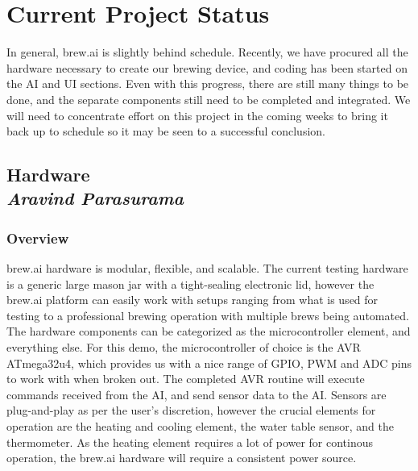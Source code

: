 \documentclass[draftclsnofoot,onecolumn,letterpaper,10pt]{IEEEtran}
\begin{document}
\section{Current Project Status}
In general, brew.ai is slightly behind schedule. Recently, we have procured all the hardware necessary to create our brewing device, and coding has been started on the AI and UI sections. Even with this progress, there are still many things to be done, and the separate components still need to be completed and integrated.
We will need to concentrate effort on this project in the coming weeks to bring it back up to schedule so it may be seen to a successful conclusion.

\subsection{Hardware\\{\em\textbf{Aravind Parasurama}}}
\subsubsection{Overview}
brew.ai hardware is modular, flexible, and scalable.
The current testing hardware is a generic large mason jar with a tight-sealing
electronic lid, however the brew.ai platform can easily work with setups ranging
from what is used for testing to a professional brewing operation with multiple
brews being automated.
The hardware components can be categorized as the microcontroller element, and
everything else.
For this demo, the microcontroller of choice is the AVR ATmega32u4, which provides
us with a nice range of GPIO, PWM and ADC pins to work with when broken out.
The completed AVR routine will execute commands received from the AI, and send
sensor data to the AI.
Sensors are plug-and-play as per the user's discretion, however the crucial elements
for operation are the heating and cooling element, the water table sensor, and
the thermometer.
As the heating element requires a lot of power for continous operation, the brew.ai
hardware will require a consistent power source.
\end{document}
